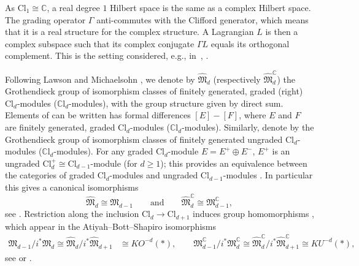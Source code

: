 \documentclass[10pt,a4paper]{amsart}
\numberwithin{equation}{section}
\newcommand{\C}{\mathbb{C}}
\newcommand{\Cl}{\mathrm{Cl}}
\newcommand{\CCl}{\mathbb{C}\mathrm{l}}
\begin{document}
\begin{Example}
As $\Cl_1 \cong \C$, a real degree $1$ Hilbert space is the same as a complex Hilbert space.
The grading operator $\Gamma$ anti-commutes with the Clifford generator, which means that it is a real structure for the complex structure.
A Lagrangian $L$ is then a complex subspace such that its complex conjugate $\Gamma L$ equals its orthogonal complement.
This is the setting considered, e.g., in~\cite[Section~2.2]{StolzTeichnerElliptic}, \cite{LudewigRoos}.
\end{Example}

Following Lawson and Michaelsohn \cite{LawsonMichelsohn}, we denote by $\hat{\mathfrak{M}}_d$ (respectively $\hat{\mathfrak{M}}_d^\C$) the Grothendieck group of isomorphism classes of finitely generated, graded (right) $\Cl_d$-modules ($\CCl_d$-modules), with the group structure given by direct sum.
Elements of \smash{$\hat{\mathfrak{M}}_d^{(\C)}$} can be written has formal differences $[E] - [F]$, where $E$ and $F$ are finitely generated, graded $\Cl_d$-modules ($\CCl_d$-modules).
Similarly, denote by \smash{$\mathfrak{M}_d^{(\C)}$} the Grothendieck group of isomorphism classes of finitely generated ungraded $\Cl_d$-modules ($\CCl_d$-modules).
For any graded $\Cl_d$-module $E = E^+ \oplus E^-$, $E^+$ is an ungraded $\Cl_d^+ \cong \Cl_{d-1}$-module (for $d \geq 1$); this provides an equivalence between the categories of graded $\Cl_d$-modules and ungraded $\Cl_{d-1}$-modules \cite[Proposition~5.20]{LawsonMichelsohn}.
In particular this gives a canonical isomorphisms
\begin{equation*} %
 \hat{\mathfrak{M}}_d \cong \mathfrak{M}_{d-1}\qquad \text{and} \qquad \hat{\mathfrak{M}}^\C_d \cong \mathfrak{M}^\C_{d-1},
\end{equation*}
see \cite[Proposition~5.1]{AtiyahBottShapiro}.
Restriction along the inclusion $\Cl_d \to \Cl_{d+1}$ induces group homo\-morphisms \smash{$i^*\colon \mathfrak{M}_{d+1}^{(\C)} \to \mathfrak{M}_d^{(\C)}$}, which appear in the Atiyah--Bott--Shapiro isomorphisms
\begin{align*}
 \mathfrak{M}_{d-1} / i^* \mathfrak{M}_d \cong \hat{\mathfrak{M}}_d / i^* \hat{\mathfrak{M}}_{d+1} &\cong KO^{-d}(*), \qquad
 \mathfrak{M}^\C_{d-1} / i^* \mathfrak{M}^\C_d \cong \hat{\mathfrak{M}}^\C_d / i^* \hat{\mathfrak{M}}^\C_{d+1} \cong KU^{-d}(*),%
 \end{align*}
see \cite{AtiyahBottShapiro} or \cite[Theorem~I.9.27]{LawsonMichelsohn}.
\end{document}
